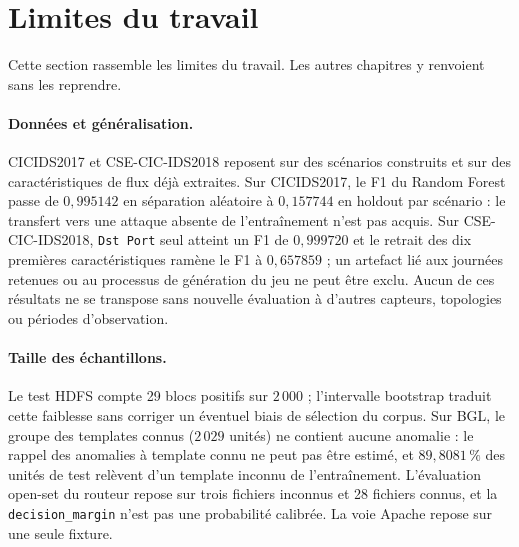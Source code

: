 
\section{Limites du travail}
\label{sec:limites}

Cette section rassemble les limites du travail. Les autres chapitres y
renvoient sans les reprendre.

\paragraph{Données et généralisation.}
CICIDS2017 et CSE-CIC-IDS2018 reposent sur des scénarios construits et sur
des caractéristiques de flux déjà extraites. Sur CICIDS2017, le F1 du Random
Forest passe de $0{,}995142$ en séparation aléatoire à $0{,}157744$ en
holdout par scénario : le transfert vers une attaque absente de
l'entraînement n'est pas acquis. Sur CSE-CIC-IDS2018, \texttt{Dst Port} seul
atteint un F1 de $0{,}999720$ et le retrait des dix premières
caractéristiques ramène le F1 à $0{,}657859$ ; un artefact lié aux journées
retenues ou au processus de génération du jeu ne peut être exclu. Aucun de
ces résultats ne se transpose sans nouvelle évaluation à d'autres capteurs,
topologies ou périodes d'observation.

\paragraph{Taille des échantillons.}
Le test HDFS compte 29 blocs positifs sur $2\,000$ ; l'intervalle bootstrap
traduit cette faiblesse sans corriger un éventuel biais de sélection du
corpus. Sur BGL, le groupe des templates connus ($2\,029$ unités) ne contient
aucune anomalie : le rappel des anomalies à template connu ne peut pas être
estimé, et $89{,}8081\,\%$ des unités de test relèvent d'un template inconnu
de l'entraînement. L'évaluation open-set du routeur repose sur trois fichiers
inconnus et 28 fichiers connus, et la \texttt{decision\_margin} n'est pas une
probabilité calibrée. La voie Apache repose sur une seule fixture.

